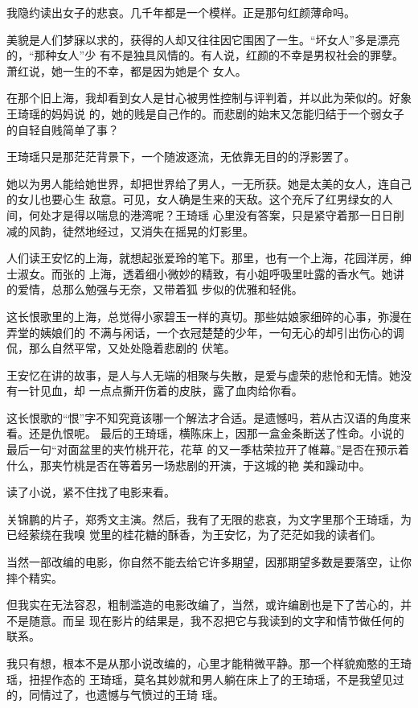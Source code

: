 		我隐约读出女子的悲哀。几千年都是一个模样。正是那句红颜薄命吗。

		美貌是人们梦寐以求的，获得的人却又往往因它围困了一生。“坏女人”多是漂亮的，“那种女人”少
	有不是独具风情的。有人说，红颜的不幸是男权社会的罪孽。萧红说，她一生的不幸，都是因为她是个
	女人。

		在那个旧上海，我却看到女人是甘心被男性控制与评判着，并以此为荣似的。好象王琦瑶的妈妈说
	的，她的贱是自己作的。而悲剧的始末又怎能归结于一个弱女子的自轻自贱简单了事？

		王琦瑶只是那茫茫背景下，一个随波逐流，无依靠无目的的浮影罢了。

		她以为男人能给她世界，却把世界给了男人，一无所获。她是太美的女人，连自己的女儿也要心生
	敌意。可见，女人确是生来的天敌。这个充斥了红男绿女的人间，何处才是得以喘息的港湾呢？王琦瑶
	心里没有答案，只是紧守着那一日日削减的风韵，徒然地经过，又消失在摇晃的灯影里。

		人们读王安忆的上海，就想起张爱玲的笔下。那里，也有一个上海，花园洋房，绅士淑女。而张的
	上海，透着细小微妙的精致，有小姐呼吸里吐露的香水气。她讲的爱情，总那么勉强与无奈，又带着狐
	步似的优雅和轻佻。

		这长恨歌里的上海，总觉得小家碧玉一样的真切。那些姑娘家细碎的心事，弥漫在弄堂的姨娘们的
	不满与闲话，一个衣冠楚楚的少年，一句无心的却引出伤心的调侃，那么自然平常，又处处隐着悲剧的
	伏笔。

		王安忆在讲的故事，是人与人无端的相聚与失散，是爱与虚荣的悲怆和无情。她没有一针见血，却
	一点点撕开伤着的皮肤，露了血肉给你看。

		这长恨歌的“恨”字不知究竟该哪一个解法才合适。是遗憾吗，若从古汉语的角度来看。还是仇恨呢。
	最后的王琦瑶，横陈床上，因那一盒金条断送了性命。小说的最后一句“对面盆里的夹竹桃开花，花草
	的又一季枯荣拉开了帷幕。”是否在预示着什么，那夹竹桃是否在等着另一场悲剧的开演，于这城的艳
	美和躁动中。

		读了小说，紧不住找了电影来看。

		关锦鹏的片子，郑秀文主演。然后，我有了无限的悲哀，为文字里那个王琦瑶，为已经萦绕在我嗅
	觉里的桂花糖的酥香，为王安忆，为了茫茫如我的读者们。

		当然一部改编的电影，你自然不能去给它许多期望，因那期望多数是要落空，让你摔个精实。

		但我实在无法容忍，粗制滥造的电影改编了，当然，或许编剧也是下了苦心的，并不是随意。而呈
	现在影片的结果是，我不忍把它与我读到的文字和情节做任何的联系。

		我只有想，根本不是从那小说改编的，心里才能稍微平静。那一个样貌痴憨的王琦瑶，扭捏作态的
	王琦瑶，莫名其妙就和男人躺在床上了的王琦瑶，不是我望见过的，同情过了，也遗憾与气愤过的王琦
	瑶。


